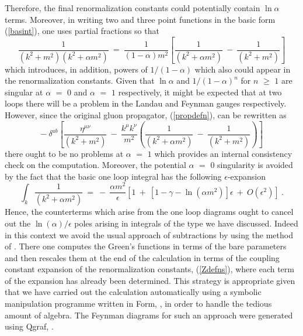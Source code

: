 \documentclass[a4paper,11pt]{article}
\begin{document}
Therefore, the final renormalization constants could potentially contain 
$\ln \alpha$ terms. Moreover, in writing two and three point functions in the 
basic form (\ref{basint}), one uses partial fractions so that  
\begin{equation} 
\frac{1}{(k^2+m^2)(k^2+\alpha m^2)} ~=~ \frac{1}{(1-\alpha)m^2} 
\left[ \frac{1}{(k^2+\alpha m^2)} ~-~ \frac{1}{(k^2+m^2)} \right] 
\end{equation} 
which introduces, in addition, powers of $1/(1-\alpha)$ which also could appear
in the renormalization constants. Given that $\ln\alpha$ and $1/(1-\alpha)^n$
for $n$ $\geq$ $1$ are singular at $\alpha$ $=$ $0$ and $\alpha$ $=$ $1$
respectively, it might be expected that at two loops there will be a problem in
the Landau and Feynman gauges respectively. However, since the original gluon
propagator, (\ref{propdefn}), can be rewritten as  
\begin{equation}
-~ \delta^{ab} \left[ \frac{\eta^{\mu\nu}}{(k^2+m^2)} ~-~ 
\frac{k^\mu k^\nu}{m^2} \left( \frac{1}{(k^2+\alpha m^2)} ~-~ 
\frac{1}{(k^2+m^2)} \right) \right] 
\end{equation} 
there ought to be no problems at $\alpha$ $=$ $1$ which provides an internal
consistency check on the computation. Moreover, the potential $\alpha$ $=$ $0$
singularity is avoided by the fact that the basic one loop integral has the 
following $\epsilon$-expansion 
\begin{equation} 
\int_k \frac{1}{(k^2+\alpha m^2)} ~=~ -~ \frac{\alpha m^2}{\epsilon} \left[
1 ~+~ [1 - \gamma - \ln (\alpha m^2) ] \epsilon ~+~ O(\epsilon^2) \right] ~.  
\end{equation} 
Hence, the counterterms which arise from the one loop diagrams ought to cancel 
out the $\ln(\alpha)/\epsilon$ poles arising in integrals of the type we have 
discussed. Indeed in this context we avoid the usual approach of subtractions 
by using the method of \cite{22}. There one computes the Green's functions in 
terms of the bare parameters and then rescales them at the end of the 
calculation in terms of the coupling constant expansion of the renormalization 
constants, (\ref{Zdefns}), where each term of the expansion has already been 
determined. This strategy is appropriate given that we have carried out the 
calculation automatically using a symbolic manipulation programme written in 
{\sc Form}, \cite{23}, in order to handle the tedious amount of algebra. The 
Feynman diagrams for such an approach were generated using {\sc Qgraf}, 
\cite{24}. 
\end{document}
